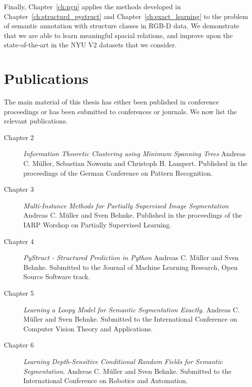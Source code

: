 Finally, Chapter~\ref{ch:nyu} applies the methods developed in
Chapter~\ref{ch:structurd_pystruct} and Chapter~\ref{ch:exact_learning} to the
problem of semantic annotation with structure classes in RGB-D data. We
demonstrate that we are able to learn meaningful spacial relations, and improve
upon the state-of-the-art in the NYU V2 datasets that we consider.

\section{Publications}
The main material of this thesis has either been published in conference
proceedings or has been submitted to conferences or journals. We now list the
relevant publications.
\begin{description}
    \item[Chapter 2] \emph{Information Theoretic Clustering using Minimum Spanning Trees} Andreas C. M\"uller, Sebastian Nowozin and Christoph H. Lampert. Published in the proceedings of the German Conference on Pattern Recognition.
    \item[Chapter 3] \emph{Multi-Instance Methods for Partially Supervised Image Segmentation} Andreas C. M\"uller and Sven Behnke. Published in the proceedings of the IARP Worshop on Partially Supervised Learning.
    \item[Chapter 4] \emph{PyStruct - Structured Prediction in Python} Andreas C. M\"uller and Sven Behnke. Submitted to the Journal of Machine Learning Research, Open Source Software track.
    \item[Chapter 5] \emph{Learning a Loopy Model for Semantic Segmentation Exactly}. Andreas C. M\"uller and Sven Behnke. Submitted to the International Conference on Computer Vision Theory and Applications.
    \item[Chapter 6] \emph{Learning Depth-Sensitive Conditional Random Fields for Semantic Segmentation}. Andreas C. M\"uller and Sven Behnke. Submitted to the International Conference on Robotics and Automation.
\end{description}
